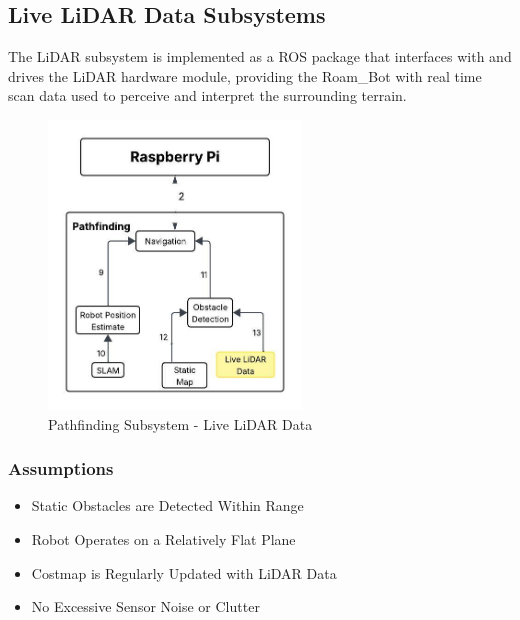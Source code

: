 \subsection{Live LiDAR Data Subsystems}
The LiDAR subsystem is implemented as a ROS package that interfaces with and drives the LiDAR hardware module, providing the Roam\_Bot with real time scan data used to perceive and interpret the surrounding terrain.
\begin{figure}[h!]
	\centering
 	\includegraphics[width=0.60\textwidth]{images/pathfinding 2/Data_Flow_LiveLiDAR.jpeg}
 \caption{Pathfinding Subsystem - Live LiDAR Data} %
\end{figure}

\subsubsection{Assumptions}
\begin{itemize}
    \item Static Obstacles are Detected Within Range
    \item Robot Operates on a Relatively Flat Plane
    \item Costmap is Regularly Updated with LiDAR Data
    \item No Excessive Sensor Noise or Clutter
\end{itemize}

